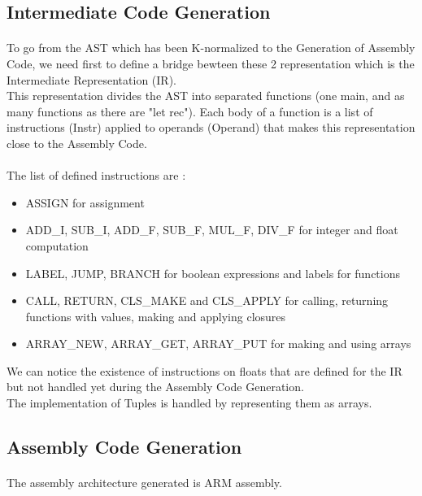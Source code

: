 \documentclass[a4paper,10pt]{article}
\begin{document}
\subsection{Intermediate Code Generation}
\paragraph{}
	To go from the AST which has been K-normalized to the Generation of Assembly Code, we need first to define a bridge bewteen these 2 representation which is the Intermediate Representation (IR).\\
    This representation divides the AST into separated functions (one main, and as many functions as there are "let rec"). Each body of a function is a list of instructions (Instr) applied to operands (Operand) that makes this representation close to the Assembly Code.\\
    
\paragraph{}
	The list of defined instructions are : 
    
    \begin{itemize}
    \item ASSIGN for assignment
    \item ADD\_I, SUB\_I, ADD\_F, SUB\_F, MUL\_F, DIV\_F for integer and float computation
    \item LABEL, JUMP, BRANCH for boolean expressions and labels for functions
    \item CALL, RETURN, CLS\_MAKE and CLS\_APPLY for calling, returning functions with values, making and applying closures
    \item ARRAY\_NEW, ARRAY\_GET, ARRAY\_PUT for making and using arrays
    \end{itemize}
    

We can notice the existence of instructions on floats that are defined for the IR but not handled yet during the Assembly Code Generation.\\
The implementation of Tuples is handled by representing them as arrays.\\

\subsection{Assembly Code Generation }
\paragraph{}
	The assembly architecture generated is ARM assembly. \\
    
\end{document}
